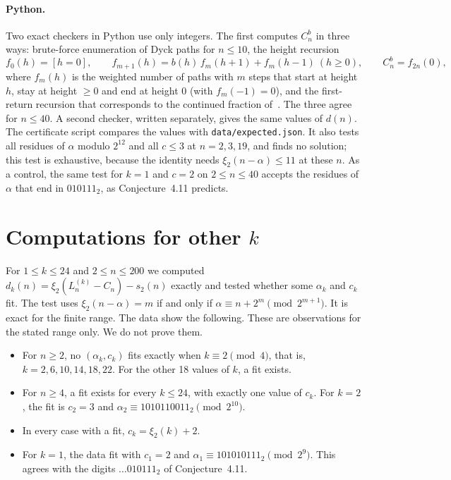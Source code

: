 \documentclass[11pt]{article}
\theoremstyle{remark}
\begin{document}
\paragraph{Python.} Two exact checkers in Python use only integers. The first computes $C^b_n$ in three ways: brute-force enumeration of Dyck paths for $n\le 10$, the height recursion
\begin{equation}\label{eq:rec}
f_0(h)=[h=0],\qquad f_{m+1}(h)=b(h)\,f_m(h+1)+f_m(h-1)\ (h\ge 0),\qquad C^b_n=f_{2n}(0),
\end{equation}
where $f_m(h)$ is the weighted number of paths with $m$ steps that start at height $h$, stay at height $\ge0$ and end at height $0$ (with $f_m(-1)=0$), and the first-return recursion that corresponds to the continued fraction of~\cite[Proposition~1.2]{GG}. The three agree for $n\le 40$. A second checker, written separately, gives the same values of $d(n)$. The certificate script compares the values with \texttt{data/expected.json}. It also tests all residues of $\alpha$ modulo $2^{12}$ and all $c\le 3$ at $n=2,3,19$, and finds no solution; this test is exhaustive, because the identity needs $\xi_2(n-\alpha)\le 11$ at these $n$. As a control, the same test for $k=1$ and $c=2$ on $2\le n\le 40$ accepts the residues of $\alpha$ that end in $010111_2$, as Conjecture~4.11 predicts.

\section{Computations for other $k$}\label{sec:survey}

For $1\le k\le 24$ and $2\le n\le 200$ we computed $d_k(n)=\xi_2(L^{(k)}_n-C_n)-s_2(n)$ exactly and tested whether some $\alpha_k$ and $c_k$ fit. The test uses $\xi_2(n-\alpha)=m$ if and only if $\alpha\equiv n+2^m\pmod{2^{m+1}}$. It is exact for the finite range. The data show the following. These are observations for the stated range only. We do not prove them.
\begin{itemize}
\item For $n\ge 2$, no $(\alpha_k,c_k)$ fits exactly when $k\equiv 2\pmod 4$, that is, $k=2,6,10,14,18,22$. For the other 18 values of $k$, a fit exists.
\item For $n\ge 4$, a fit exists for every $k\le 24$, with exactly one value of $c_k$. For $k=2$, the fit is $c_2=3$ and $\alpha_2\equiv 1010110011_2 \pmod{2^{10}}$.
\item In every case with a fit, $c_k=\xi_2(k)+2$.
\item For $k=1$, the data fit with $c_1=2$ and $\alpha_1\equiv 101010111_2\pmod{2^{9}}$. This agrees with the digits $\dots010111_2$ of Conjecture~4.11.
\end{itemize}
\end{document}
